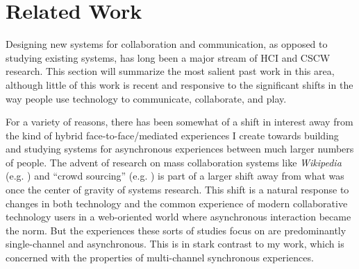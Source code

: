 



\section{Related Work}
Designing new systems for collaboration and communication, as opposed to studying existing systems, has long been a major stream of HCI and CSCW research. This section will summarize the most salient past work in this area, although little of this work is recent and responsive to the significant shifts in the way people use technology to communicate, collaborate, and play. 

For a variety of reasons, there has been somewhat of a shift in interest away from the kind of hybrid face-to-face/mediated experiences I create towards building and studying systems for asynchronous experiences between much larger numbers of people. The advent of research on mass collaboration systems like \emph{Wikipedia} (e.g. \citep{Kittur:2007up}) and ``crowd sourcing'' (e.g. \citep{Bernstein:2010wk}) is part of a larger shift away from what was once the center of gravity of systems research. This shift is a natural response to changes in both technology and the common experience of modern collaborative technology users in a web-oriented world where asynchronous interaction became the norm. But the experiences these sorts of studies focus on are predominantly single-channel and asynchronous. This is in stark contrast to my work, which is concerned with the properties of multi-channel synchronous experiences. 

